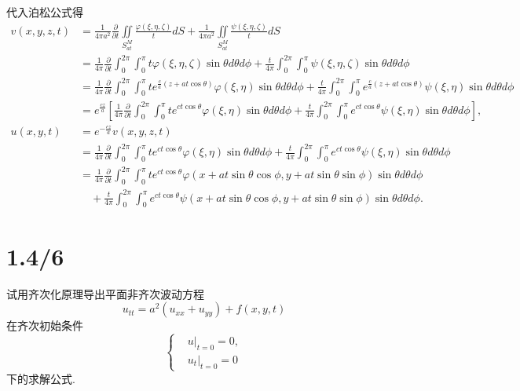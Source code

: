 \documentclass[11pt,a4paper]{article}
\begin{document}
代入泊松公式得
\begin{align*}
  v(x,y,z,t)
   & =\frac{1}{4\pi a^2}\frac{\partial}{\partial t}\iint\limits_{S_{at}^M}\frac{\varphi(\xi,\eta,\zeta)}{t}dS+\frac{1}{4\pi a^2}\iint\limits_{S_{at}^M}\frac{\psi(\xi,\eta,\zeta)}{t}dS                                                                      \\
   & =\frac{1}{4\pi}\frac{\partial}{\partial t}\int_0^{2\pi}\int_0^\pi t\varphi(\xi,\eta,\zeta)\sin\theta d\theta d\phi+\frac{t}{4\pi}\int_0^{2\pi}\int_0^\pi \psi(\xi,\eta,\zeta)\sin\theta d\theta d\phi                                                   \\
   & =\frac{1}{4\pi}\frac{\partial}{\partial t}\int_0^{2\pi}\int_0^\pi te^{\frac{c}{a}(z+at\cos\theta)}\varphi(\xi,\eta)\sin\theta d\theta d\phi+\frac{t}{4\pi}\int_0^{2\pi}\int_0^\pi e^{\frac{c}{a}(z+at\cos\theta)}\psi(\xi,\eta)\sin\theta d\theta d\phi \\
   & =e^{\frac{cz}{a}}\left[\frac{1}{4\pi}\frac{\partial}{\partial t}\int_0^{2\pi}\int_0^\pi te^{ct\cos\theta}\varphi(\xi,\eta)\sin\theta d\theta d\phi+\frac{t}{4\pi}\int_0^{2\pi}\int_0^\pi e^{ct\cos\theta}\psi(\xi,\eta)\sin\theta d\theta d\phi\right], \\
  u(x,y,t)
   & =e^{-\frac{cz}{a}}v(x,y,z,t)                                                                                                                                                                                                                            \\
   & =\frac{1}{4\pi}\frac{\partial}{\partial t}\int_0^{2\pi}\int_0^\pi te^{ct\cos\theta}\varphi(\xi,\eta)\sin\theta d\theta d\phi+\frac{t}{4\pi}\int_0^{2\pi}\int_0^\pi e^{ct\cos\theta}\psi(\xi,\eta)\sin\theta d\theta d\phi                               \\
   & =\frac{1}{4\pi}\frac{\partial}{\partial t}\int_0^{2\pi}\int_0^\pi te^{ct\cos\theta}\varphi(x+at\sin\theta\cos\phi,y+at\sin\theta\sin\phi)\sin\theta d\theta d\phi                                                                                       \\
   & \quad+\frac{t}{4\pi}\int_0^{2\pi}\int_0^\pi e^{ct\cos\theta}\psi(x+at\sin\theta\cos\phi,y+at\sin\theta\sin\phi)\sin\theta d\theta d\phi.
\end{align*}

\section{1.4/6}
\begin{problem}
试用齐次化原理导出平面非齐次波动方程
$$u_{tt}=a^2(u_{xx}+u_{yy})+f(x,y,t)$$
在齐次初始条件
$$\left\{\begin{aligned}
     & u|_{t=0}=0,  \\
     & u_t|_{t=0}=0
  \end{aligned}\right.$$
下的求解公式.
\end{problem}
\end{document}
